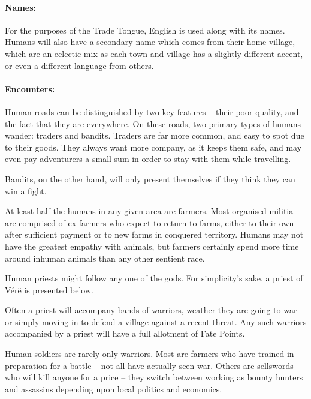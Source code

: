 \begin{multicols}{2}
\paragraph{Names:} For the purposes of the Trade Tongue, English is used along with its names.
Humans will also have a secondary name which comes from their home village, which are an eclectic mix as each town and village has a slightly different accent, or even a different language from others.

\paragraph{Encounters:} Human roads can be distinguished by two key features -- their poor quality, and the fact that they are everywhere.
On these roads, two primary types of humans wander: traders and bandits.
Traders are far more common, and easy to spot due to their goods.
They always want more company, as it keeps them safe, and may even pay adventurers a small sum in order to stay with them while travelling.

Bandits, on the other hand, will only present themselves if they think they can win a fight.

\label{human_trader}

At least half the humans in any given area are farmers.
Most organised militia are comprised of ex farmers who expect to return to farms, either to their own after sufficient payment or to new farms in conquered territory.
Humans may not have the greatest empathy with animals, but farmers certainly spend more time around inhuman animals than any other sentient race.


\label{human_priest}

Human priests might follow any one of the gods.
For simplicity's sake, a priest of V\'{e}r\"{e} is presented below.


Often a priest will accompany bands of warriors, weather they are going to war or simply moving in to defend a village against a recent threat.
Any such warriors accompanied by a priest will have a full allotment of Fate Points.

\label{human_soldier}

Human soldiers are rarely only warriors.
Most are farmers who have trained in preparation for a battle -- not all have actually seen war.
Others are sellswords who will kill anyone for a price -- they switch between working as bounty hunters and assassins depending upon local politics and economics.


\end{multicols}
